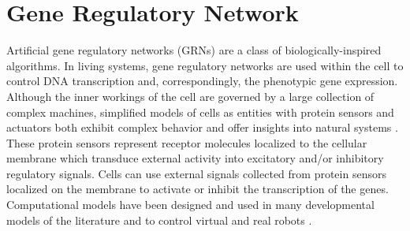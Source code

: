\section{Gene Regulatory Network}

Artificial gene regulatory networks (GRNs) are a class of biologically-inspired
algorithms. In living systems, gene regulatory networks are used within the cell
to control DNA transcription and, correspondingly, the phenotypic gene
expression. Although the inner workings of the cell are governed by a large collection
of complex machines, simplified models of cells as entities with protein sensors and actuators
both exhibit complex behavior and offer insights into natural systems \cite{Davidson2006}.
These protein sensors represent receptor molecules localized to the cellular membrane
which transduce external activity into excitatory and/or inhibitory regulatory signals.
Cells can use external signals collected from protein sensors localized
on the membrane to activate or inhibit the transcription of the genes.
Computational models have been designed and used in many developmental models of the
literature \cite{Joachimczak08, Doursat09, CussatBlanc2012a} and to control
virtual and real robots \cite{ziegler2001evolving, Nicolau10, Joachimczak10, CussatBlanc2012b}. 

